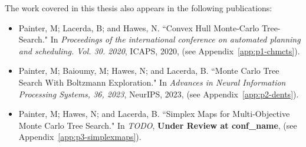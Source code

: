 
    The work covered in this thesis also appears in the following publications:
    \begin{itemize}
        \item Painter, M; Lacerda, B; and Hawes, N. ``Convex Hull Monte-Carlo Tree-Search." In \textit{Proceedings of the international conference on automated planning and scheduling. Vol. 30. 2020}, ICAPS, 2020, (see Appendix~\ref{app:p1-chmcts}).
        \item Painter, M; Baioumy, M; Hawes, N; and Lacerda, B.  ``Monte Carlo Tree Search With Boltzmann Exploration." In \textit{Advances in Neural Information Processing Systems, 36, 2023}, NeurIPS, 2023, (see Appendix~\ref{app:p2-dents}).
        \item Painter, M; Hawes, N; and Lacerda, B. ``Simplex Maps for Multi-Objective Monte Carlo Tree Search." In \textit{TODO}, \textbf{Under Review at conf\_name}, (see Appendix~\ref{app:p3-simplexmaps}).
    \end{itemize}
